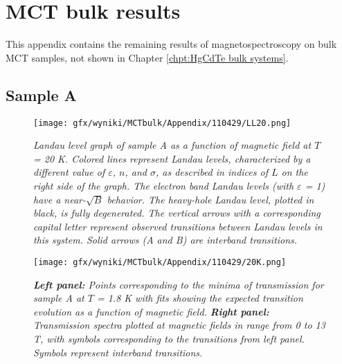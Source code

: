 \documentclass[titlepage,a4paper]{book}
\newcommand{\wciecie}{\quad\phantom{v}}
\begin{document}

\chapter{MCT bulk results}
\label{Appendix_bulk}
\wciecie
This appendix contains the remaining results of magnetospectroscopy on bulk MCT samples, not shown in Chapter \ref{chpt:HgCdTe bulk systems}.
\section{Sample A}
\begin{figure}[ht]
	\centering
	\texttt{[image: gfx/wyniki/MCTbulk/Appendix/110429/LL20.png]}
	\vspace{-10pt}
	\caption{\textit{Landau level graph of sample A as a function of magnetic field at $T$ = 20 K. Colored lines represent Landau levels, characterized by a different value of $\varepsilon$, $n$, and $\sigma$, as described in indices of $L$ on the right side of the graph. The electron band Landau levels (with $\varepsilon$ = 1) have a near-$\sqrt{B}$ behavior. The heavy-hole Landau level, plotted in black, is fully degenerated. The vertical arrows with a corresponding capital letter represent observed transitions between Landau levels in this system. Solid arrows (A and B) are interband transitions.}}
	\label{fig:LL_110429_20K}
\end{figure}
\begin{figure}[ht]
	\centering
	\texttt{[image: gfx/wyniki/MCTbulk/Appendix/110429/20K.png]}
	\vspace{-10pt}
	\caption{\textit{\textbf{Left panel:} Points corresponding to the minima of transmission for sample A at $T$ = 1.8 K with fits showing the expected transition evolution as a function of magnetic field. \textbf{Right panel:} Transmission spectra plotted at magnetic fields in range from 0 to 13 T, with symbols corresponding to the transitions from left panel. Symbols represent interband transitions.}}
	\label{fig:Spectra_110429_20K}
\end{figure} 
\end{document}
